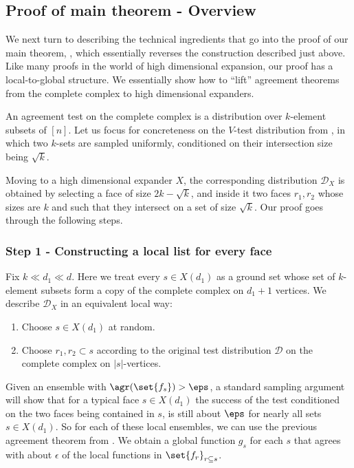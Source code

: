 \documentclass{article}[11pt]
\begin{document}
\subsection*{Proof of main theorem - Overview}

We next turn to describing the technical ingredients that go into the proof of our main theorem,  , which essentially reverses the construction described just above. 
%
Like many proofs in the world of high dimensional expansion, our proof has a local-to-global structure. We essentially show how to ``lift'' agreement theorems from the complete complex to high dimensional expanders. 

An agreement test on the complete complex is a distribution over $k$-element subsets of $[n]$. Let us focus for concreteness on the \(V\)-test distribution from \cite{ImpagliazzoKW2012}, in which two $k$-sets are sampled uniformly, conditioned on their intersection size being $\sqrt k$. 

Moving to a high dimensional expander $X$, the corresponding distribution $\mathcal{D}_X$ is obtained by selecting a face of size $2k-\sqrt k$, and inside it two faces $r_1,r_2$ whose sizes are $k$ and such that they intersect on a set of size $\sqrt k$. Our proof goes through the following steps.

\subsubsection*{Step 1 - Constructing a local list for every face}
Fix \(k \ll d_1 \ll d\). 
Here we treat every \(s \in X(d_1)\) as a ground set whose set of $k$-element subsets form a copy of the complete complex on $d_1+1$ vertices. We describe \(\mathcal{D}_X\) in an equivalent local way:
\begin{enumerate}
    \item Choose $s\in X(d_1)$ at random.
    \item Choose $r_1,r_2\subset s$ according to the original test distribution $\mathcal{D}$ on the complete complex on \(|s|\)-vertices.
\end{enumerate} 
Given an ensemble with $\agr(\set{f_s})>\eps$, a standard sampling argument will show that for a typical face $s\in X(d_1)$ the success of the test conditioned on the two faces being contained in $s$, is still about $\eps$ for nearly all sets $s\in X(d_1)$. So for each of these local ensembles, we can use the previous agreement theorem from \cite{ImpagliazzoKW2012}. We obtain a global function $g_s$ for each $s$ that agrees with about $\epsilon$ of the local functions in \(\set{f_r}_{r \subseteq s}\).
\end{document}
